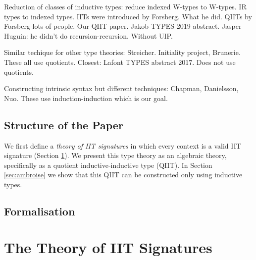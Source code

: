 \documentclass[a4paper,UKenglish,cleveref, autoref]{lipics-v2019}
\begin{document}
Reduction of classes of inductive types: reduce indexed W-types to
W-types. IR types to indexed types. IITs were introduced by
Forsberg. What he did.  QIITs by Forsberg-lots of people. Our QIIT
paper. Jakob TYPES 2019 abstract.  Jasper Huguin: he didn't do
recursion-recursion. Without UIP.

Similar techique for other type theories: Streicher. Initiality
project, Brunerie. These all use quotients. Closest: Lafont TYPES
abstract 2017. Does not use quotients.

Constructing intrinsic syntax but different techniques: Chapman,
Danielsson, Nuo. These use induction-induction which is our goal.

\subsection{Structure of the Paper}

We first define a \emph{theory of IIT signatures} in which every context is a
valid IIT signature (Section \ref{sec:theory_of_signatures}). We present this
type theory as an algebraic \cite{ttintt} theory, specifically as a quotient
inductive-inductive type (QIIT). In Section \ref{sec:ambroise} we show that this
QIIT can be constructed only using inductive types.

\subsection{Formalisation}


\section{The Theory of IIT Signatures}
\label{sec:theory_of_signatures}
\end{document}
